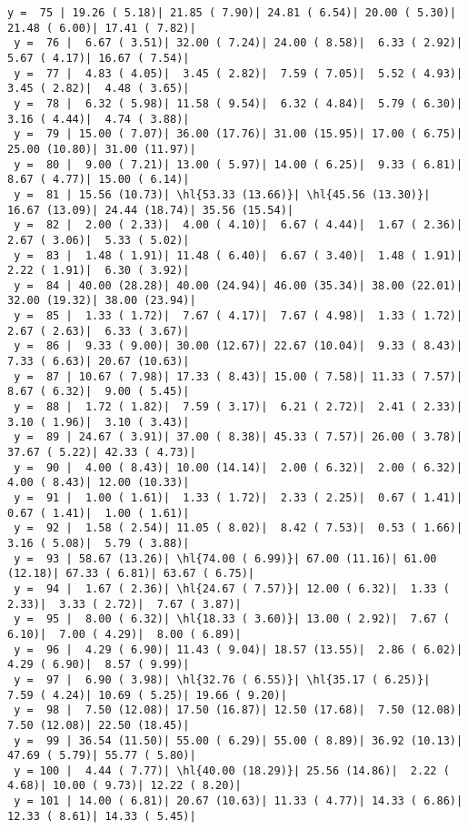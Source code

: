 \documentclass[10pt]{article}
\newcommand{\hl}[1]{\textcolor{blue}{#1}}
\begin{document}
\begin{Verbatim}[fontsize=\small, commandchars=\\\{\}]
 y =  75 | 19.26 ( 5.18)| 21.85 ( 7.90)| 24.81 ( 6.54)| 20.00 ( 5.30)| 21.48 ( 6.00)| 17.41 ( 7.82)|
 y =  76 |  6.67 ( 3.51)| 32.00 ( 7.24)| 24.00 ( 8.58)|  6.33 ( 2.92)|  5.67 ( 4.17)| 16.67 ( 7.54)|
 y =  77 |  4.83 ( 4.05)|  3.45 ( 2.82)|  7.59 ( 7.05)|  5.52 ( 4.93)|  3.45 ( 2.82)|  4.48 ( 3.65)|
 y =  78 |  6.32 ( 5.98)| 11.58 ( 9.54)|  6.32 ( 4.84)|  5.79 ( 6.30)|  3.16 ( 4.44)|  4.74 ( 3.88)|
 y =  79 | 15.00 ( 7.07)| 36.00 (17.76)| 31.00 (15.95)| 17.00 ( 6.75)| 25.00 (10.80)| 31.00 (11.97)|
 y =  80 |  9.00 ( 7.21)| 13.00 ( 5.97)| 14.00 ( 6.25)|  9.33 ( 6.81)|  8.67 ( 4.77)| 15.00 ( 6.14)|
 y =  81 | 15.56 (10.73)| \hl{53.33 (13.66)}| \hl{45.56 (13.30)}| 16.67 (13.09)| 24.44 (18.74)| 35.56 (15.54)|
 y =  82 |  2.00 ( 2.33)|  4.00 ( 4.10)|  6.67 ( 4.44)|  1.67 ( 2.36)|  2.67 ( 3.06)|  5.33 ( 5.02)|
 y =  83 |  1.48 ( 1.91)| 11.48 ( 6.40)|  6.67 ( 3.40)|  1.48 ( 1.91)|  2.22 ( 1.91)|  6.30 ( 3.92)|
 y =  84 | 40.00 (28.28)| 40.00 (24.94)| 46.00 (35.34)| 38.00 (22.01)| 32.00 (19.32)| 38.00 (23.94)|
 y =  85 |  1.33 ( 1.72)|  7.67 ( 4.17)|  7.67 ( 4.98)|  1.33 ( 1.72)|  2.67 ( 2.63)|  6.33 ( 3.67)|
 y =  86 |  9.33 ( 9.00)| 30.00 (12.67)| 22.67 (10.04)|  9.33 ( 8.43)|  7.33 ( 6.63)| 20.67 (10.63)|
 y =  87 | 10.67 ( 7.98)| 17.33 ( 8.43)| 15.00 ( 7.58)| 11.33 ( 7.57)|  8.67 ( 6.32)|  9.00 ( 5.45)|
 y =  88 |  1.72 ( 1.82)|  7.59 ( 3.17)|  6.21 ( 2.72)|  2.41 ( 2.33)|  3.10 ( 1.96)|  3.10 ( 3.43)|
 y =  89 | 24.67 ( 3.91)| 37.00 ( 8.38)| 45.33 ( 7.57)| 26.00 ( 3.78)| 37.67 ( 5.22)| 42.33 ( 4.73)|
 y =  90 |  4.00 ( 8.43)| 10.00 (14.14)|  2.00 ( 6.32)|  2.00 ( 6.32)|  4.00 ( 8.43)| 12.00 (10.33)|
 y =  91 |  1.00 ( 1.61)|  1.33 ( 1.72)|  2.33 ( 2.25)|  0.67 ( 1.41)|  0.67 ( 1.41)|  1.00 ( 1.61)|
 y =  92 |  1.58 ( 2.54)| 11.05 ( 8.02)|  8.42 ( 7.53)|  0.53 ( 1.66)|  3.16 ( 5.08)|  5.79 ( 3.88)|
 y =  93 | 58.67 (13.26)| \hl{74.00 ( 6.99)}| 67.00 (11.16)| 61.00 (12.18)| 67.33 ( 6.81)| 63.67 ( 6.75)|
 y =  94 |  1.67 ( 2.36)| \hl{24.67 ( 7.57)}| 12.00 ( 6.32)|  1.33 ( 2.33)|  3.33 ( 2.72)|  7.67 ( 3.87)|
 y =  95 |  8.00 ( 6.32)| \hl{18.33 ( 3.60)}| 13.00 ( 2.92)|  7.67 ( 6.10)|  7.00 ( 4.29)|  8.00 ( 6.89)|
 y =  96 |  4.29 ( 6.90)| 11.43 ( 9.04)| 18.57 (13.55)|  2.86 ( 6.02)|  4.29 ( 6.90)|  8.57 ( 9.99)|
 y =  97 |  6.90 ( 3.98)| \hl{32.76 ( 6.55)}| \hl{35.17 ( 6.25)}|  7.59 ( 4.24)| 10.69 ( 5.25)| 19.66 ( 9.20)|
 y =  98 |  7.50 (12.08)| 17.50 (16.87)| 12.50 (17.68)|  7.50 (12.08)|  7.50 (12.08)| 22.50 (18.45)|
 y =  99 | 36.54 (11.50)| 55.00 ( 6.29)| 55.00 ( 8.89)| 36.92 (10.13)| 47.69 ( 5.79)| 55.77 ( 5.80)|
 y = 100 |  4.44 ( 7.77)| \hl{40.00 (18.29)}| 25.56 (14.86)|  2.22 ( 4.68)| 10.00 ( 9.73)| 12.22 ( 8.20)|
 y = 101 | 14.00 ( 6.81)| 20.67 (10.63)| 11.33 ( 4.77)| 14.33 ( 6.86)| 12.33 ( 8.61)| 14.33 ( 5.45)|
\end{Verbatim}
\end{document}

